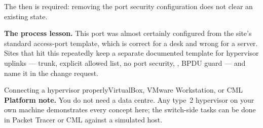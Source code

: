 \begin{breakfix}
The  then  is required: removing the port security
configuration does not clear an existing  state.

\textbf{The process lesson.} This port was almost certainly configured from the
site's standard access-port template, which is correct for a desk and wrong for a
server. Sites that hit this repeatedly keep a separate documented template for
hypervisor uplinks --- trunk, explicit allowed list, no port security,
, BPDU guard --- and name it in the change request.
\end{breakfix}

\begin{lab}{Connecting a hypervisor properly}{VirtualBox, VMware Workstation, or CML}
\textbf{Platform note.} You do not need a data centre. Any type~2 hypervisor on
your own machine demonstrates every concept here; the switch-side tasks can be
done in Packet Tracer or CML against a simulated host.


\end{lab}
